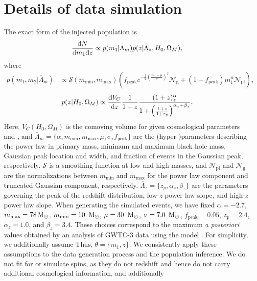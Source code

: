 \documentclass[preprint2,linenumbers]{aastex631}
\begin{document}
\section{Details of data simulation}
\label{ap:data generation}
The exact form of the injected population is
\begin{equation}
\label{eq:underlying population}
    \frac{\diff N}{\diff m_1 \diff z} \propto p(m_1|\bar{\Lambda}_m) p(z|\bar{\Lambda}_z, H_0, \Omega_M),
\end{equation}
where 
\begin{align}
    p(m_1,m_2|\bar{\Lambda}_m) &\propto \mathcal{S}(m_{\min},m_{\max})
    \left( f_{\text{peak}}e^{-\frac{1}{2}(\frac{m_1-\mu}{\sigma})^2}\mathcal{N}_{\text{g}} +
    (1-f_{\text{peak}})m_1^{\alpha}\mathcal{N}_{\text{pl}} \right) ,
\label{eq:underlying mass dist}
\end{align}
\begin{equation}
    p(z|H_0, \Omega_M) \propto \frac{\diff V_C}{\diff z} \frac{1}{1+z} \frac{(1+z)^\alpha_z}{1+\left(\frac{1+z}{1+z_p}\right)^{\alpha_z+\beta_z}}.
    \label{eq:underlying redshift dist}
\end{equation}
Here, $V_C(H_0, \Omega_M)$ is the comoving volume for given cosmological parameters \Ho{} and \Omm{}, and $\bar{\Lambda}_m = \{\alpha, m_{\min}, m_{\max}, \mu, \sigma, f_{\text{peak}}\}$ are the (hyper-)parameters describing the power law in primary mass, minimum and maximum black hole mass, Gaussian peak location and width, and fraction of events in the Gaussian peak, respectively.
$\mathcal{S}$ is a smoothing function at low and high masses, and $\mathcal{N}_{\text{pl}}$ and $\mathcal{N}_{\text{g}}$ are the normalizations between  $m_{\min}$ and $m_{\max}$ for the power law component and truncated Gaussian component, respectively.
$\bar{\Lambda}_z = \{z_p,\alpha_z,\beta_z\}$ are the parameters governing the peak of the redshift distribution, low-$z$ power law slope, and high-$z$ power law slope.
When generating the simulated events, we have fixed $\alpha=-2.7$, $m_{\max}=78\,\text{M}_{\odot}$, $m_{\min}=10~\,\text{M}_{\odot}$, $\mu=30~\,\text{M}_{\odot}$, $\sigma=7.0~\,\text{M}_{\odot}$, $f_{\text{peak}}=0.05$, $z_p=2.4$, $\alpha_z=1.0$, and $\beta_z=3.4$.
These choices correspond to the maximum \emph{a posteriori} values obtained by an analysis of GWTC-3 data using the \plp{} model \citep{abbott_population_2023}.
For simplicity, we additionally assume 
Thus, $\theta = \{m_1,z\}$.
We consistently apply these assumptions to the data generation process and the population inference.
We do not fit for or simulate spins, as they do not redshift and hence do not carry additional cosmological information, and additionally 
\end{document}
